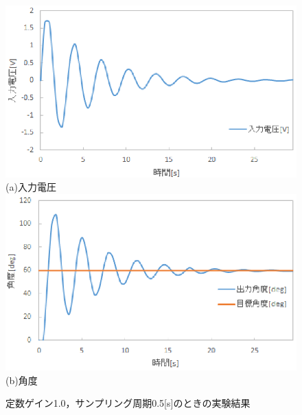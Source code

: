 \documentclass[11pt,a4paper]{jsarticle}
\begin{document}
\begin{figure}[H]
 \begin{center}
  \includegraphics[scale=.6]{./picture/graph5.eps} \\
  (a)入力電圧 \\
  \includegraphics[scale=.6]{./picture/graph6.eps} \\
  (b)角度
  \caption{定数ゲイン1.0，サンプリング周期0.5[s]のときの実験結果}
  \label{fig5}
 \end{center}
\end{figure}
\end{document}
